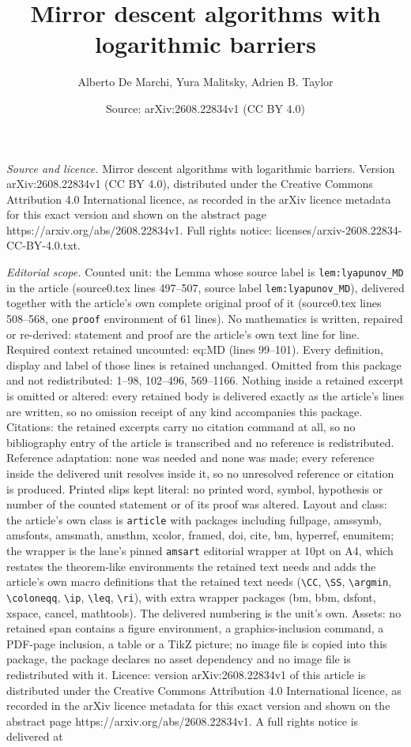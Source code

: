 \documentclass[10pt,a4paper]{amsart}
\title[Mirror descent algorithms with logarithmic barriers]{Mirror descent algorithms with logarithmic barriers}
\author{Alberto De Marchi, Yura Malitsky, Adrien B. Taylor}
\date{Source: arXiv:2608.22834v1 (CC BY 4.0)}
\begin{document}
\maketitle

\noindent\emph{Source and licence.} Mirror descent algorithms with logarithmic barriers. Version arXiv:2608.22834v1 (CC BY 4.0), distributed under the Creative Commons Attribution 4.0 International licence, as recorded in the arXiv licence metadata for this exact version and shown on the abstract page https://arxiv.org/abs/2608.22834v1. Full rights notice: licenses/arxiv-2608.22834-CC-BY-4.0.txt.\par\smallskip

\noindent\textit{Editorial scope.} Counted unit: the Lemma whose source label is \texttt{lem:lyapunov\_MD} in the article (source0.tex lines 497--507, source label \texttt{lem:lyapunov\_MD}), delivered together with the article's own complete original proof of it (source0.tex lines 508--568, one \texttt{proof} environment of 61 lines). No mathematics is written, repaired or re-derived: statement and proof are the article's own text line for line. Required context retained uncounted: eq:MD (lines 99--101). Every definition, display and label of those lines is retained unchanged. Omitted from this package and not redistributed: 1--98, 102--496, 569--1166. Nothing inside a retained excerpt is omitted or altered: every retained body is delivered exactly as the article's lines are written, so no omission receipt of any kind accompanies this package. Citations: the retained excerpts carry no citation command at all, so no bibliography entry of the article is transcribed and no reference is redistributed. Reference adaptation: none was needed and none was made; every reference inside the delivered unit resolves inside it, so no unresolved reference or citation is produced. Printed slips kept literal: no printed word, symbol, hypothesis or number of the counted statement or of its proof was altered. Layout and class: the article's own class is \texttt{article} with packages including fullpage, amssymb, amsfonts, amsmath, amsthm, xcolor, framed, doi, cite, bm, hyperref, enumitem; the wrapper is the lane's pinned \texttt{amsart} editorial wrapper at 10pt on A4, which restates the theorem-like environments the retained text needs and adds the article's own macro definitions that the retained text needs (\texttt{\textbackslash CC}, \texttt{\textbackslash SS}, \texttt{\textbackslash argmin}, \texttt{\textbackslash coloneqq}, \texttt{\textbackslash ip}, \texttt{\textbackslash leq}, \texttt{\textbackslash ri}), with extra wrapper packages (bm, bbm, dsfont, xspace, cancel, mathtools). The delivered numbering is the unit's own. Assets: no retained span contains a figure environment, a graphics-inclusion command, a PDF-page inclusion, a table or a TikZ picture; no image file is copied into this package, the package declares no asset dependency and no image file is redistributed with it. Licence: version arXiv:2608.22834v1 of this article is distributed under the Creative Commons Attribution 4.0 International licence, as recorded in the arXiv licence metadata for this exact version and shown on the abstract page https://arxiv.org/abs/2608.22834v1. A full rights notice is delivered at 
\end{document}
